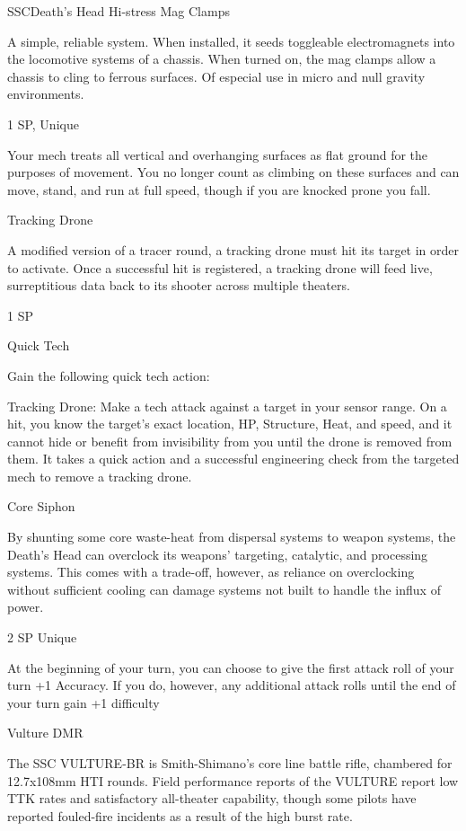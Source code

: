 \begin{mech}{SSC}{Death's Head}
Hi-stress Mag Clamps

A simple, reliable system. When installed, it seeds toggleable electromagnets into the locomotive systems of a chassis. When turned on, the mag clamps allow a chassis to cling to ferrous surfaces. Of especial use in micro and null gravity environments.

1 SP, Unique

Your mech treats all vertical and overhanging surfaces as flat ground for the purposes of movement. You no longer count as climbing on these surfaces and can move, stand, and run at full speed, though if you are knocked prone you fall.


Tracking Drone

A modified version of a tracer round, a tracking drone must hit its target in order to activate. Once a successful hit is registered, a tracking drone will feed live, surreptitious data back to its shooter across multiple theaters.

1 SP

Quick Tech

Gain the following quick tech action:

Tracking Drone: Make a tech attack against a target in your sensor range. On a hit, you know the target’s exact location, HP, Structure, Heat, and speed, and it cannot hide or benefit from invisibility from you until the drone is removed from them. It takes a quick action and a successful engineering check from the targeted mech to remove a tracking drone.


Core Siphon

By shunting some core waste-heat from dispersal systems to weapon systems, the Death’s Head can overclock its weapons’ targeting, catalytic, and processing systems. This comes with a trade-off, however, as reliance on overclocking without sufficient cooling can damage systems not built to handle the influx of power.

2 SP
Unique

At the beginning of your turn, you can choose to give the first attack roll of your turn +1 Accuracy. If you do, however, any additional attack rolls until the end of your turn gain +1 difficulty


Vulture DMR

The SSC VULTURE-BR is Smith-Shimano’s core line battle rifle, chambered for 12.7x108mm HTI rounds. Field performance reports of the VULTURE report low TTK rates and satisfactory all-theater capability, though some pilots have reported fouled-fire incidents as a result of the high burst rate.


\end{mech}
